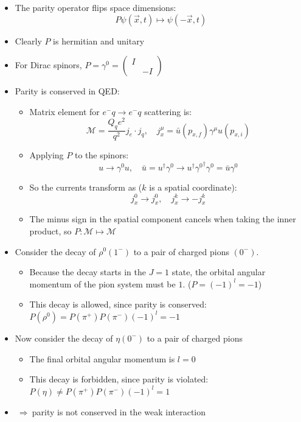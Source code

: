 \documentclass[11pt]{article}
\newcommand{\x}{\vec{x}}
\newcommand{\ubar}{\bar{u}}
\newcommand{\Mme}{\mathcal{M}}
\newcommand{\el}{\ensuremath{e^{-}}}
\newcommand{\thus}{\ensuremath{~\Rightarrow~}}
\begin{document}
\begin{itemize}
  \item The parity operator flips space dimensions:
  \begin{equation}
    P \psi(\x,t)\mapsto \psi(-\x,t)
  \end{equation}
  \item Clearly $P$ is hermitian and unitary
  \item For Dirac spinors, $P = \gamma^0 = \begin{pmatrix} I & \\ & -I \end{pmatrix}$
  \item Parity is conserved in QED:
  \begin{itemize}
    \item Matrix element for $\el q \rightarrow \el q$ scattering is:
    \begin{equation}
      \Mme = \frac{Q_qe^2}{q^2}j_e \cdot j_q, \quad j_x^\mu = \ubar(p_{x,f})\gamma^\mu u(p_{x,i})
    \end{equation}
    \item Applying $P$ to the spinors:
    \begin{equation}
      u \rightarrow \gamma^0 u, \quad \ubar = u^\dag\gamma^0 \rightarrow u^\dag {\gamma^0}^\dag \gamma^0 = \ubar \gamma^0
    \end{equation}
    \item So the currents transform as ($k$ is a spatial coordinate):
    \begin{equation}
      j_x^0 \rightarrow j_x^0, \quad j_x^k \rightarrow -j_x^k
    \end{equation}
    \item The minus sign in the spatial component cancels when taking the inner product, so $P:\Mme \mapsto \Mme$
  \end{itemize}
  \item Consider the decay of $\rho^0(1^-)$ to a pair of charged pions $(0^-)$. 
  \begin{itemize}
    \item Because the decay starts in the $J=1$ state, the orbital angular momentum of the pion system must be $1$. ($P = (-1)^l = -1$)
    \item This decay is allowed, since parity is conserved: $P(\rho^0) = P(\pi^+)P(\pi^-)(-1)^l = -1$
  \end{itemize}
  \item Now consider the decay of $\eta(0^-)$ to a pair of charged pions
  \begin{itemize}
    \item The final orbital angular momentum is $l=0$
    \item This decay is forbidden, since parity is violated: $P(\eta) \neq P(\pi^+)P(\pi^-)(-1)^l = 1$
  \end{itemize}
  \item \thus parity is not conserved in the weak interaction
\end{itemize}
\end{document}
